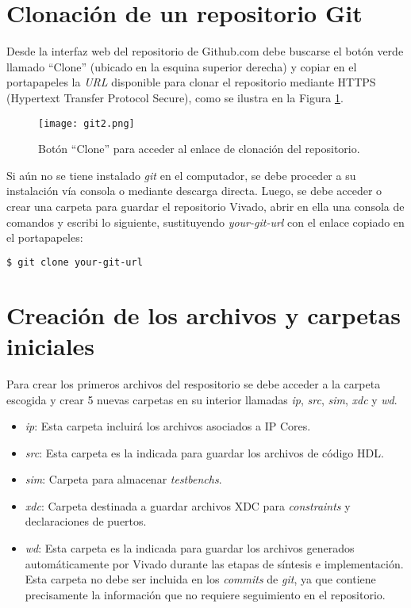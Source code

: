 \section{Clonación de un repositorio Git}

	Desde la interfaz web del repositorio de Github.com debe buscarse el botón verde llamado ``Clone'' (ubicado en la esquina superior derecha) y copiar en el portapapeles la \textit{URL} disponible para clonar el repositorio mediante HTTPS (Hypertext Transfer Protocol Secure), como se ilustra en la Figura \ref{fig:git2}.
	
	\begin{figure}[ht]
		\centering
		\texttt{[image: git2.png]}
		\caption{Botón ``Clone'' para acceder al enlace de clonación del repositorio.}
		\label{fig:git2}
	\end{figure}
	
	Si aún no se tiene instalado \textit{git} en el computador, se debe proceder a su instalación vía consola o mediante descarga directa. Luego, se debe acceder o crear una carpeta para guardar el repositorio Vivado, abrir en ella una consola de comandos y escribi lo siguiente, sustituyendo \textit{your-git-url} con el enlace copiado en el portapapeles:

\begin{lstlisting}[language=bash]
$ git clone your-git-url
\end{lstlisting}


\section{Creación de los archivos y carpetas iniciales}

	Para crear los primeros archivos del respositorio se debe acceder a la carpeta escogida y crear 5 nuevas carpetas en su interior llamadas \textit{ip}, \textit{src},  \textit{sim}, \textit{xdc} y \textit{wd}.
	
	\begin{itemize}
		\item \textit{ip}: Esta carpeta incluirá los archivos asociados a IP Cores.
		\item \textit{src}: Esta carpeta es la indicada para guardar los archivos de código HDL.
		\item \textit{sim}: Carpeta para almacenar \textit{testbenchs}.
		\item \textit{xdc}: Carpeta destinada a guardar archivos XDC para \textit{constraints} y declaraciones de puertos.
		\item \textit{wd}: Esta carpeta es la indicada para guardar los archivos generados automáticamente por Vivado durante las etapas de síntesis e implementación. Esta carpeta no debe ser incluida en los \textit{commits} de \textit{git}, ya que contiene precisamente la información que no requiere seguimiento en el repositorio.	
	\end{itemize}
	
